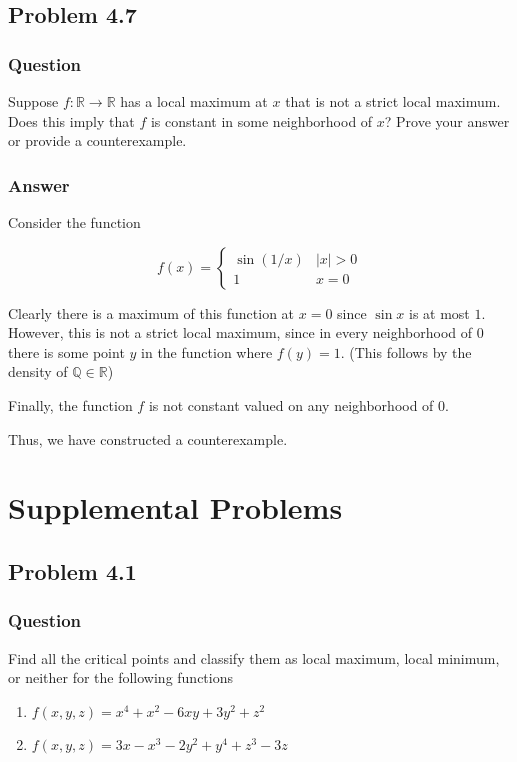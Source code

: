 \documentclass[12pt]{article}
\begin{document}
\subsection{Problem 4.7}
\subsubsection{Question}
Suppose $f:\mathbb{R} \to \mathbb{R}$ has a local maximum at $x$ that is not a strict local maximum. Does this imply that $f$ is constant in some neighborhood of $x$? Prove your answer or provide a counterexample.


\subsubsection{Answer}

Consider the function 

\[f(x)= \left\{ \begin{array} {lr} \sin{(1/x)} & |x|>0 \\ 1& x = 0 \end{array} \right.\]

Clearly there is a maximum of this function at $x=0$ since $\sin{x}$ is at most $1$. However, this is not a strict local maximum, since in every neighborhood of $0$ there is some point $y$ in the function where $f(y)=1$. (This follows by the density of $\mathbb{Q} \in \mathbb{R}$)

Finally, the function $f$ is not constant valued on any neighborhood of $0$.

Thus, we have constructed a counterexample.

\section{Supplemental Problems}

\subsection{Problem 4.1}
\subsubsection{Question}
Find all the critical points and classify them as local maximum, local minimum, or neither for the following functions
\begin{enumerate}
\item $f(x,y,z)=x^4+x^2-6xy+3y^2+z^2$
\item $f(x,y,z)=3x-x^3-2y^2+y^4+z^3-3z$
\end{enumerate}
\end{document}
